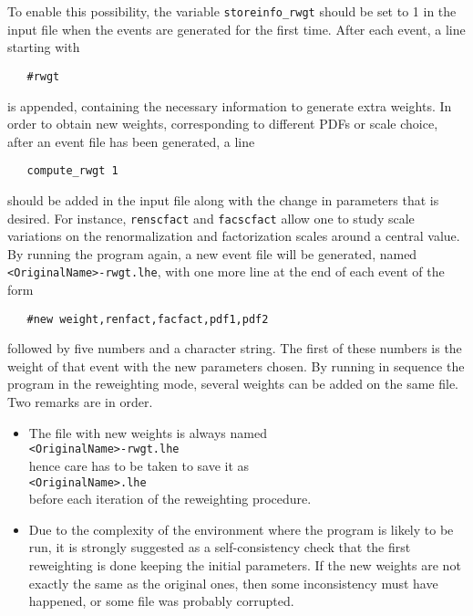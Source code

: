 To enable this possibility, the variable \texttt{storeinfo\_rwgt} should be set 
to 1 in the \powheg input file when the events are generated for the 
first time. After each event, a line starting with 
\begin{verbatim}
   #rwgt 
\end{verbatim}
is appended, containing the necessary information to generate extra 
weights. In order to obtain new weights, corresponding to different 
PDFs or scale choice, after an event file has been generated, a line 
\begin{verbatim}
   compute_rwgt 1 
\end{verbatim}
should be added in the input file along with the change in parameters
that is desired. For instance, \texttt{renscfact} and
\texttt{facscfact} allow one to study scale variations on the
renormalization and factorization scales around a central value. By
running the program again, a new event file will be generated, named
\texttt{<OriginalName>-rwgt.lhe}, with one more line at the end of each event of the form
\begin{verbatim}
   #new weight,renfact,facfact,pdf1,pdf2 
\end{verbatim}
followed by five numbers and a character string. The first of these 
numbers is the weight of that event with the new parameters chosen. By 
running in sequence the program in the reweighting mode, several 
weights can be added on the same file. Two remarks are in order.

\begin{itemize} 

\item The file with new weights is always named \\
\texttt{<OriginalName>-rwgt.lhe}\\
hence care has to be taken to save it as \\
\texttt{<OriginalName>.lhe}\\
before each iteration of the reweighting procedure. 

\item Due to the complexity of the environment where the program is 
likely to be run, it is strongly suggested as a self-consistency check 
that the first reweighting is done keeping the initial parameters. If 
the new weights are not exactly the same as the original ones, then 
some inconsistency must have happened, or some file was probably 
corrupted. 

\end{itemize} 

